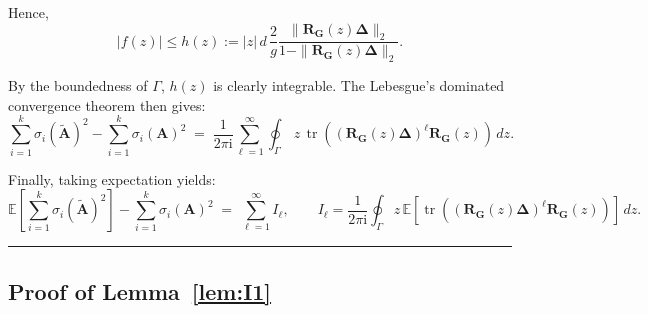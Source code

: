 \documentclass{article}
\newcommand{\twonorm}[1]{\|#1\|_2}
\newcommand{\Ex}[1]{\mbox{}\mathbb{E}\left[#1\right]}
\newcommand{\Ab}{\mathbf{A}}
\newcommand{\Gb}{\mathbf{G}}
\newcommand{\Rb}{\mathbf{R}}
\newcommand{\Abtil}{\tilde{\Ab}}
\newcommand{\BlackBox}{\rule{1.5ex}{1.5ex}}  %
\newenvironment{proof}{\par\noindent{\bf Proof\ }}{\hfill\BlackBox\par\medskip}
\newcommand{\tr}{\mathop{\mathrm{tr}}}
\newcommand{\rbr}[1]{\left(#1\right)}
\newcommand{\abr}[1]{\left|#1\right|}
\newcommand{\Deltab}{\boldsymbol{\Delta}}
\begin{document}
\begin{proof}
Hence, 
\begin{equation}
    \abr{f(z)} \le h(z) := \abr{z}\, d \, \frac{2}{g} \frac{\twonorm{\Rb_\Gb(z)\Deltab}}{1-\twonorm{\Rb_\Gb(z)\Deltab}}.
\end{equation}

By the boundedness of $\Gamma$, $h(z)$ is clearly integrable. The Lebesgue's dominated convergence theorem then gives:
\begin{equation}
     \sum_{i=1}^{k}\sigma_i(\Abtil)^2 - \sum_{i=1}^{k}\sigma_i(\Ab)^2 \;= \; \frac{1}{2\pi \mathrm{i}}\sum_{\ell=1}^{\infty}\oint_\Gamma  \,z\,\tr\rbr{\rbr{\Rb_\Gb(z)\Deltab}^\ell \Rb_\Gb(z)}\,dz.
\end{equation}

Finally, taking expectation yields:
\begin{equation*}
    \Ex{\sum_{i=1}^{k}\sigma_i(\Abtil)^2} - \sum_{i=1}^{k}\sigma_i(\Ab)^2 \;=\; \sum_{\ell=1}^{\infty} I_\ell, \qquad I_\ell = \frac{1}{2\pi \mathrm{i}}\oint_\Gamma z\,\Ex{\tr\rbr{\rbr{\Rb_\Gb(z)\Deltab}^\ell \Rb_\Gb(z)}}\,dz.
\end{equation*}
\end{proof}

\subsection{Proof of Lemma~\ref{lem:I1}}\label{app:I1}
\end{document}
